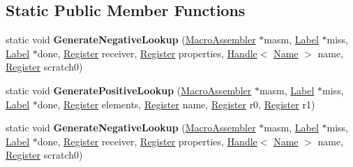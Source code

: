 \subsection*{Static Public Member Functions}
\begin{DoxyCompactItemize}
\item 
static void {\bfseries Generate\+Negative\+Lookup} (\hyperlink{classv8_1_1internal_1_1_macro_assembler}{Macro\+Assembler} $\ast$masm, \hyperlink{classv8_1_1internal_1_1_label}{Label} $\ast$miss, \hyperlink{classv8_1_1internal_1_1_label}{Label} $\ast$done, \hyperlink{structv8_1_1internal_1_1_register}{Register} receiver, \hyperlink{structv8_1_1internal_1_1_register}{Register} properties, \hyperlink{classv8_1_1internal_1_1_handle}{Handle}$<$ \hyperlink{classv8_1_1internal_1_1_name}{Name} $>$ name, \hyperlink{structv8_1_1internal_1_1_register}{Register} scratch0)\hypertarget{classv8_1_1internal_1_1_name_dictionary_lookup_stub_af482a387d734450846cb8363ec668f9f}{}\label{classv8_1_1internal_1_1_name_dictionary_lookup_stub_af482a387d734450846cb8363ec668f9f}

\item 
static void {\bfseries Generate\+Positive\+Lookup} (\hyperlink{classv8_1_1internal_1_1_macro_assembler}{Macro\+Assembler} $\ast$masm, \hyperlink{classv8_1_1internal_1_1_label}{Label} $\ast$miss, \hyperlink{classv8_1_1internal_1_1_label}{Label} $\ast$done, \hyperlink{structv8_1_1internal_1_1_register}{Register} elements, \hyperlink{structv8_1_1internal_1_1_register}{Register} name, \hyperlink{structv8_1_1internal_1_1_register}{Register} r0, \hyperlink{structv8_1_1internal_1_1_register}{Register} r1)\hypertarget{classv8_1_1internal_1_1_name_dictionary_lookup_stub_a412b10faeb56ffafd637fe7388ae567b}{}\label{classv8_1_1internal_1_1_name_dictionary_lookup_stub_a412b10faeb56ffafd637fe7388ae567b}

\item 
static void {\bfseries Generate\+Negative\+Lookup} (\hyperlink{classv8_1_1internal_1_1_macro_assembler}{Macro\+Assembler} $\ast$masm, \hyperlink{classv8_1_1internal_1_1_label}{Label} $\ast$miss, \hyperlink{classv8_1_1internal_1_1_label}{Label} $\ast$done, \hyperlink{structv8_1_1internal_1_1_register}{Register} receiver, \hyperlink{structv8_1_1internal_1_1_register}{Register} properties, \hyperlink{classv8_1_1internal_1_1_handle}{Handle}$<$ \hyperlink{classv8_1_1internal_1_1_name}{Name} $>$ name, \hyperlink{structv8_1_1internal_1_1_register}{Register} scratch0)\hypertarget{classv8_1_1internal_1_1_name_dictionary_lookup_stub_af482a387d734450846cb8363ec668f9f}{}\label{classv8_1_1internal_1_1_name_dictionary_lookup_stub_af482a387d734450846cb8363ec668f9f}


\end{DoxyCompactItemize}
